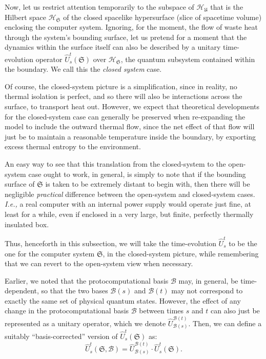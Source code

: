 \documentclass[preprints,article,accept,moreauthors,pdftex]{Definitions/mdpi}
\begin{document}
\begin{paracol}{2}
Now, let us restrict attention temporarily to the subspace of $\mathcal{H}_\mathfrak{U}$ that is the Hilbert space $\mathcal{H}_\mathfrak{S}$ of the closed spacelike hypersurface (slice of spacetime volume) enclosing the computer system. Ignoring, for the moment, the flow of waste heat through the system's bounding surface, let us pretend for a moment that the dynamics within the surface itself can also be described by a unitary time-evolution operator $\widehat{U}_s^t(\mathfrak{S})$ over $\mathcal{H}_\mathfrak{S}$, the quantum subsystem contained within the boundary. We call this the \emph{closed system} case.

Of course, the closed-system picture is a simplification, since in reality, no thermal isolation is perfect, and so there will also be interactions across the surface, to transport heat out. However, we expect that theoretical developments for the closed-system case can generally be preserved when re-expanding the model to include the outward thermal flow, since the net effect of that flow will just be to maintain a reasonable temperature inside the boundary, by exporting excess thermal entropy to the environment.

An easy way to see that this translation from the closed-system to the open-system case ought to work, in general, is simply to note that if the bounding surface of $\mathfrak{S}$ is taken to be extremely distant to begin with, then there will be negligible \emph{practical} difference between the open-system and closed-system cases. \emph{I.e.,} a real computer with an internal power supply would operate just fine, at least for a while, even if enclosed in a very large, but finite, perfectly thermally insulated box.

Thus, henceforth in this subsection, we will take the time-evolution $\widehat{U}_s^t$ to be the one for the computer system $\mathfrak{S}$, in the closed-system picture, while remembering that we can revert to the open-system view when necessary.

Earlier, we noted that the protocomputational basis $\boldsymbol{\mathcal{B}}$ may, in general, be time-dependent, so that the two bases $\boldsymbol{\mathcal{B}}(s)$ and $\boldsymbol{\mathcal{B}}(t)$ may not correspond to exactly the same set of physical quantum states. However, the effect of any change in the protocomputational basis $\boldsymbol{\mathcal{B}}$ between times $s$ and $t$ can also just be represented as a unitary operator, which we denote $\widehat{U}_{\boldsymbol{\mathcal{B}}(s)}^{\boldsymbol{\mathcal{B}}(t)}$. Then, we can define a suitably ``basis-corrected'' version of $\widehat{U}_s^t(\mathfrak{S})$ as:
\begin{equation}
    \label{eq-4}
    \widehat{U}_s^t(\mathfrak{S},\boldsymbol{\mathcal{B}}) = \widehat{U}_{\boldsymbol{\mathcal{B}}(s)}^{\boldsymbol{\mathcal{B}}(t)} \cdot \widehat{U}_s^t(\mathfrak{S}).
\end{equation}


\end{paracol}
\end{document}
